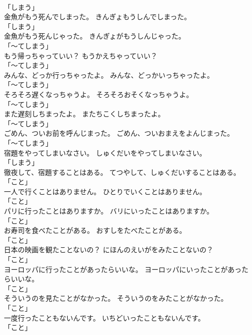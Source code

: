 \documentclass[8pt]{extreport}
\begin{document}
\begin{CJK}{UTF8}{min}
\\	「しまう」 
\\	金魚がもう死んでしまった。	きんぎょもうしんでしまった。	
\\	「しまう」 
\\	金魚がもう死んじゃった。	きんぎょがもうしんじゃった。	
\\	「～てしまう」	
\\	もう帰っちゃっていい？	もうかえちゃっていい？	
\\	「～てしまう」	
\\	みんな、どっか行っちゃったよ。	みんな、どっかいっちゃったよ。	
\\	「～てしまう」	
\\	そろそろ遅くなっちゃうよ。	そろそろおそくなっちゃうよ。	
\\	「～てしまう」	
\\	また遅刻しちまったよ。	またちこくしちまったよ。	
\\	「～てしまう」	
\\	ごめん、ついお前を呼んじまった。	ごめん、ついおまえをよんじまった。	
\\	「～てしまう」	
\\	宿題をやってしまいなさい。	しゅくだいをやってしまいなさい。	
\\	「しまう」	
\\	徹夜して、宿題することはある。	てつやして、しゅくだいすることはある。	
\\	「こと」 
\\	一人で行くことはありません。	ひとりでいくことはありません。	
\\	「こと」 
\\	パリに行ったことはありますか。	バリにいったことはありますか。	
\\	「こと」 
\\	お寿司を食べたことがある。	おすしをたべたことがある。	
\\	「こと」 
\\	日本の映画を観たことないの？	にほんのえいがをみたことないの？	
\\	「こと」 
\\	ヨーロッパに行ったことがあったらいいな。	ヨーロッパにいったことがあったらいいな。	
\\	「こと」 
\\	そういうのを見たことがなかった。	そういうのをみたことがなかった。	
\\	「こと」 
\\	一度行ったこともないんです。	いちどいったこともないんです。	
\\	「こと」 

\end{CJK}
\end{document}
